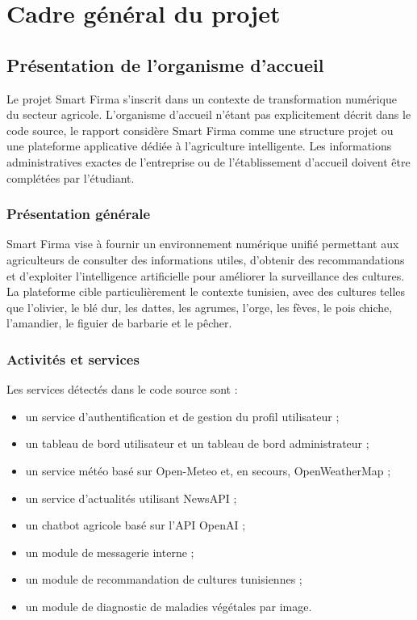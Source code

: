 \chapter{Cadre général du projet}

\section{Présentation de l'organisme d'accueil}
Le projet Smart Firma s'inscrit dans un contexte de transformation numérique du secteur agricole. L'organisme d'accueil n'étant pas explicitement décrit dans le code source, le rapport considère Smart Firma comme une structure projet ou une plateforme applicative dédiée à l'agriculture intelligente. Les informations administratives exactes de l'entreprise ou de l'établissement d'accueil doivent être complétées par l'étudiant.

\subsection{Présentation générale}
Smart Firma vise à fournir un environnement numérique unifié permettant aux agriculteurs de consulter des informations utiles, d'obtenir des recommandations et d'exploiter l'intelligence artificielle pour améliorer la surveillance des cultures. La plateforme cible particulièrement le contexte tunisien, avec des cultures telles que l'olivier, le blé dur, les dattes, les agrumes, l'orge, les fèves, le pois chiche, l'amandier, le figuier de barbarie et le pêcher.

\subsection{Activités et services}
Les services détectés dans le code source sont :
\begin{itemize}[noitemsep]
  \item un service d'authentification et de gestion du profil utilisateur ;
  \item un tableau de bord utilisateur et un tableau de bord administrateur ;
  \item un service météo basé sur Open-Meteo et, en secours, OpenWeatherMap ;
  \item un service d'actualités utilisant NewsAPI ;
  \item un chatbot agricole basé sur l'API OpenAI ;
  \item un module de messagerie interne ;
  \item un module de recommandation de cultures tunisiennes ;
  \item un module de diagnostic de maladies végétales par image.
\end{itemize}

